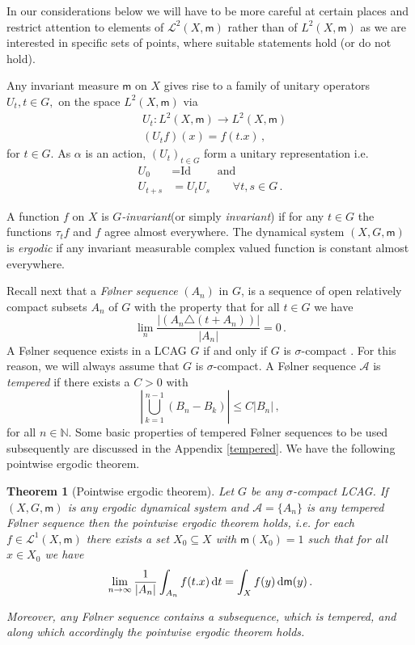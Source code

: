 \documentclass [14pt]{amsart}
\numberwithin{equation}{section}
\newcommand{\NN}{\mathbb N}
\newcommand{\cL}{{\mathcal L}}
\newcommand{\cA}{{\mathcal A}}
\newcommand{\mm}{\mathsf{m}}
\newcommand{\dd}{\mbox{\rm d}}
\newtheorem{theorem}{Theorem}[section]
\begin{document}
In our considerations below we will have to be more careful at certain places and restrict attention to elements of $\mathcal{L}^2 (X,\mm)$ rather than of $L^2 (X,\mm)$  as we are interested in specific sets of points, where suitable statements hold (or do not hold).

Any invariant  measure $\mm$  on $X$ gives rise to a family of unitary operators $U_t, t\in G,$ on the space $L^2 (X,\mm)$ via
\begin{align*}
&U_t : L^2 (X,\mm)\longrightarrow L^2 (X,\mm) \\
&(U_t f) (x) = f(t.x) \,,
\end{align*}
for $t\in G$. As $\alpha$ is an action, $(U_t)_{t \in G}$ form a unitary representation i.e.
\begin{align*}
U_0 &= \mbox{Id} \qquad  \mbox{ and } \\
U_{t+s} &= U_{t} U_s \qquad \forall t,s\in G \,.
\end{align*}

\smallskip


A  function $f$ on $X$  is \textit{$G$-invariant}(or simply \textit{invariant}) if for any $t\in G$ the functions $\tau_tf$ and $f$ agree almost everywhere. The dynamical system $(X,G,\mm)$ is \textit{ergodic} if any invariant measurable complex valued function is constant almost everywhere.

\medskip

Recall next that a \textit{ F\o lner sequence} $(A_n)$ in $G$, is a sequence of open relatively compact subsets $A_n$ of $G$  with the property that for all $t \in G$ we have
\[
\lim_n \frac{|(A_n \triangle (t+A_n))|}{|A_n|} =0 \,.
\]
A F\o lner sequence exists in a LCAG $G$ if and only if $G$ is $\sigma$-compact \cite[Prop.~B6]{SS}. For this reason, we will always assume that $G$ is $\sigma$-compact.
A F\o lner sequence $\cA$  is \textit{tempered} if there exists a $C>0$ with
  \[
  \left|\bigcup_{k=1}^{n-1} (B_n-B_k) \right| \leq C |B_n| \,,
  \]
for all $n\in \NN$.   Some basic properties of tempered F\o lner sequences to be used subsequently are discussed in the  Appendix \ref{tempered}.
We have the following pointwise ergodic theorem.

\begin{theorem}[Pointwise ergodic theorem]\label{thm-point-erg}\cite[Theorem 1.2 and Proposition 1.4]{Lin} Let $G$ be any $\sigma$-compact LCAG.  If $(X, G, \mm)$ is any ergodic dynamical system and $\cA=\{ A_n \}$ is any tempered F\o lner sequence then the \textit{pointwise ergodic theorem holds}, i.e. for each $f \in \cL^1(X,\mm)$
  there exists a set $X_0 \subseteq X$ with $\mm(X_0)=1$ such that for all $x \in X_0$ we have
\[
\lim_{n\to \infty} \frac{1}{|A_n|} \int_{A_n} f(t.x)\, \dd t = \int_X f(y) \,
\dd \mm(y) \,.
\]

Moreover, any F\o lner sequence contains a subsequence, which is tempered, and  along which accordingly  the pointwise ergodic theorem holds.
\end{theorem}
\end{document}
